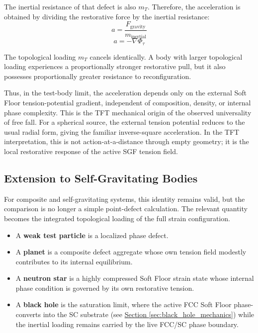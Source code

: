 The inertial resistance of that defect is also $m_T$. Therefore, the acceleration is obtained by dividing the restorative force by the inertial resistance:
\begin{equation}
    a = \frac{F_{\mathrm{gravity}}}{m_{\mathrm{inertial}}}
\end{equation}
\begin{equation}
    a = -\nabla\Phi_\tau
\end{equation}

The topological loading $m_T$ cancels identically. A body with larger topological loading experiences a proportionally stronger restorative pull, but it also possesses proportionally greater resistance to reconfiguration.

Thus, in the test-body limit, the acceleration depends only on the external Soft Floor tension-potential gradient, independent of composition, density, or internal phase complexity. This is the TFT mechanical origin of the observed universality of free fall. For a spherical source, the external tension potential reduces to the usual radial form, giving the familiar inverse-square acceleration. In the TFT interpretation, this is not action-at-a-distance through empty geometry; it is the local restorative response of the active SGF tension field.

\subsection{Extension to Self-Gravitating Bodies}

For composite and self-gravitating systems, this identity remains valid, but the comparison is no longer a simple point-defect calculation. The relevant quantity becomes the integrated topological loading of the full strain configuration.

\begin{itemize}
    \item A \textbf{weak test particle} is a localized phase defect.
    \item A \textbf{planet} is a composite defect aggregate whose own tension field modestly contributes to its internal equilibrium.
    \item A \textbf{neutron star} is a highly compressed Soft Floor strain state whose internal phase condition is governed by its own restorative tension.
    \item A \textbf{black hole} is the saturation limit, where the active FCC Soft Floor phase-converts into the SC substrate (see \hyperref[sec:black_hole_mechanics]{Section \ref*{sec:black_hole_mechanics}}) while the inertial loading remains carried by the live FCC/SC phase boundary.
\end{itemize}

